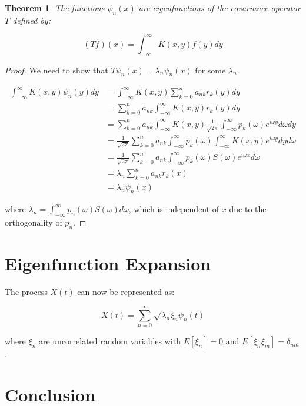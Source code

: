 \documentclass{article}
\newtheorem{theorem}{Theorem}
\begin{document}
\begin{theorem}
The functions $\psi_n(x)$ are eigenfunctions of the covariance operator $T$ defined by:

\begin{equation}
(Tf)(x) = \int_{-\infty}^{\infty} K(x,y) f(y) dy
\end{equation}
\end{theorem}

\begin{proof}
We need to show that $T\psi_n(x) = \lambda_n \psi_n(x)$ for some $\lambda_n$. 

\begin{align*}
\int_{-\infty}^{\infty} K(x,y) \psi_n(y) dy 
&= \int_{-\infty}^{\infty} K(x,y) \sum_{k=0}^n a_{nk} r_k(y) dy \\
&= \sum_{k=0}^n a_{nk} \int_{-\infty}^{\infty} K(x,y) r_k(y) dy \\
&= \sum_{k=0}^n a_{nk} \int_{-\infty}^{\infty} K(x,y) \frac{1}{\sqrt{2\pi}} \int_{-\infty}^{\infty} p_k(\omega) e^{i\omega y} d\omega dy \\
&= \frac{1}{\sqrt{2\pi}} \sum_{k=0}^n a_{nk} \int_{-\infty}^{\infty} p_k(\omega) \int_{-\infty}^{\infty} K(x,y) e^{i\omega y} dy d\omega \\
&= \frac{1}{\sqrt{2\pi}} \sum_{k=0}^n a_{nk} \int_{-\infty}^{\infty} p_k(\omega) S(\omega) e^{i\omega x} d\omega \\
&= \lambda_n \sum_{k=0}^n a_{nk} r_k(x) \\
&= \lambda_n \psi_n(x)
\end{align*}

where $\lambda_n = \int_{-\infty}^{\infty} p_n(\omega) S(\omega) d\omega$, which is independent of $x$ due to the orthogonality of $p_n$.
\end{proof}

\section{Eigenfunction Expansion}

The process $X(t)$ can now be represented as:

\begin{equation}
X(t) = \sum_{n=0}^{\infty} \sqrt{\lambda_n} \xi_n \psi_n(t)
\end{equation}

where $\xi_n$ are uncorrelated random variables with $E[\xi_n] = 0$ and $E[\xi_n \xi_m] = \delta_{nm}$.

\section{Conclusion}
\end{document}
